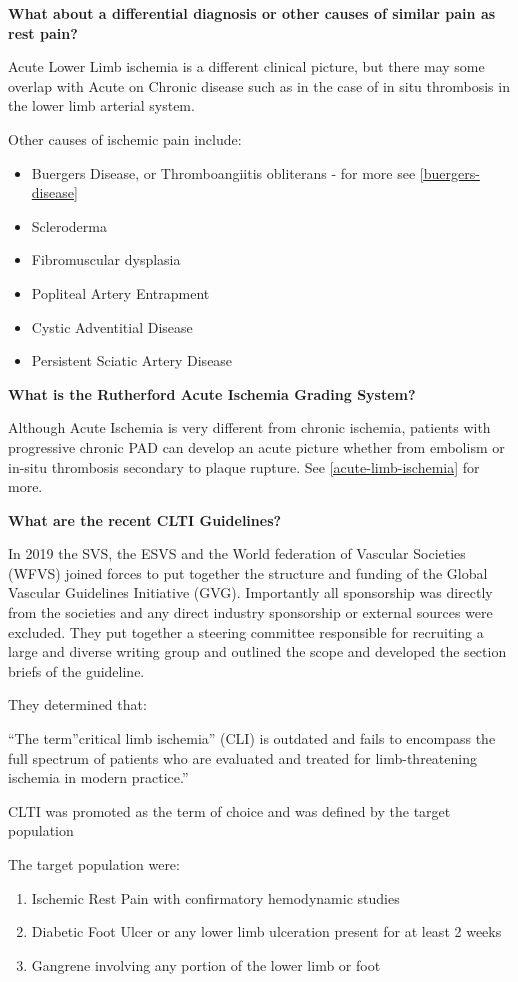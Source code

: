 \documentclass[
]{book}
\begin{document}
\textbf{What about a differential diagnosis or other causes of similar pain as
rest pain?}

Acute Lower Limb ischemia is a different clinical picture, but there may
some overlap with Acute on Chronic disease such as in the case of in
situ thrombosis in the lower limb arterial system.

Other causes of ischemic pain include:

\begin{itemize}
\item
  Buergers Disease, or Thromboangiitis obliterans - for more see
  \ref{buergers-disease}
\item
  Scleroderma
\item
  Fibromuscular dysplasia
\item
  Popliteal Artery Entrapment
\item
  Cystic Adventitial Disease
\item
  Persistent Sciatic Artery Disease
\end{itemize}

\textbf{What is the Rutherford Acute Ischemia Grading System?}

Although Acute Ischemia is very different from chronic ischemia,
patients with progressive chronic PAD can develop an acute picture
whether from embolism or in-situ thrombosis secondary to plaque rupture.
See \ref{acute-limb-ischemia} for more.

\textbf{What are the recent CLTI Guidelines?}

In 2019 the SVS, the ESVS and the World federation of Vascular Societies
(WFVS) joined forces to put together the structure and funding of the
Global Vascular Guidelines Initiative (GVG). Importantly all sponsorship
was directly from the societies and any direct industry sponsorship or
external sources were excluded. They put together a steering committee
responsible for recruiting a large and diverse writing group and
outlined the scope and developed the section briefs of the guideline.

They determined that:

``The term''critical limb ischemia'' (CLI) is outdated and fails to
encompass the full spectrum of patients who are evaluated and treated
for limb-threatening ischemia in modern practice.''

CLTI was promoted as the term of choice and was defined by the target
population

The target population were:

\begin{enumerate}
\def\labelenumi{\arabic{enumi}.}
\item
  Ischemic Rest Pain with confirmatory hemodynamic studies
\item
  Diabetic Foot Ulcer or any lower limb ulceration present for at
  least 2 weeks
\item
  Gangrene involving any portion of the lower limb or foot
\end{enumerate}
\end{document}
